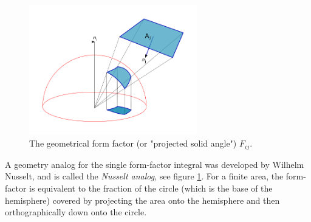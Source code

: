\begin{figure}
\sidecaption
	\includegraphics[width=0.65\textwidth]{graphics/gi/path-20}
	\caption{The geometrical form factor (or "projected solid angle") $F_{ij}$. }
	\label{f:hemispherical}
\end{figure}

A geometry analog for the single form-factor integral was developed by Wilhelm Nusselt, and is called the \textit{Nusselt analog}, see figure \ref{f:hemispherical}. For a finite area, the form-factor is equivalent to the fraction of the circle (which is the base of the hemisphere) covered by projecting the area onto the hemisphere and then orthographically down onto the circle.

